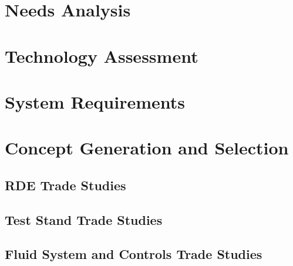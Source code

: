 \documentclass[12pt,letterpaper]{article}
\begin{document}


\doublespacing
\renewcommand{\arraystretch}{1.25}
\renewcommand{\tabularxcolumn}[1]{m{#1}}

\newpage
\section{Needs Analysis}


\newpage
\section{Technology Assessment}








\newpage
\section{System Requirements}


\newpage
\section{Concept Generation and Selection}

\subsection{RDE Trade Studies}


\subsection{Test Stand Trade Studies}



\subsection{Fluid System and Controls Trade Studies}

\newpage
\begin{flushleft}
    \singlespacing
    
    
\end{flushleft}
\end{document}
